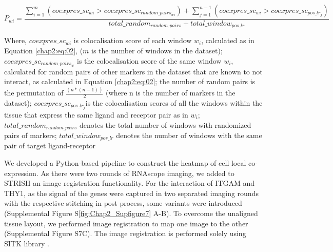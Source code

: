\begin{equation}
    P_{wi} = \frac{\sum_{i=1}^{m}(coexpres\_sc_{wi} > coexpres\_sc_{random\_pairs_{wi}})+ \sum_{j=1}^{n-1}(coexpres\_sc_{wi} > coexpres\_sc_{pos\_lr_j}) }{total\_random_{random\_pairs} + total\_window_{pos\_lr}}
    \label{chap2:eq:03}
\end{equation}

Where,	$coexpres\_sc_{wi}$  is colocalisation score of each window $w_i$, calculated as in Equation \ref{chap2:eq:02}, ($m$ is the number of windows in the dataset); $coexpres\_sc_{random\_pairs_w}$ is the colocalisation score of the same window $w_i$, calculated for random pairs of other markers in the dataset that are known to not interact, as calculated in Equation \ref{chap2:eq:02}; the number of random pairs is the permutation of $\frac{(n*(n-1))}{2}$ (where n is the number of markers in the dataset); $coexpres
\_sc_{pos\_lr_j}$is the colocalisation scores of all the windows within the tissue that express the same ligand and receptor pair as in $w_i$; $total\_random_{random\_pairs}$ denotes the total number of windows with randomized pairs of markers; $total\_window_{pos\_lr}$  denotes the number of windows with the same pair of target ligand-receptor

We developed a Python-based pipeline to construct the heatmap of cell local co-expression. 
As there were two rounds of RNAscope imaging, we added to STRISH an image registration functionality. For the interaction of ITGAM and THY1, as the signal of the genes were captured in two separated imaging rounds with the respective stitching in post process, some variants were introduced (Supplemental Figure S\ref{fig:Chap2_Supfigure7} A-B). To overcome the unaligned tissue layout, we performed image registration to map one image to the other (Supplemental Figure S7C). The image registration is performed solely using SITK library \cite{lowekamp2013design, yaniv2018simpleitk}.  


